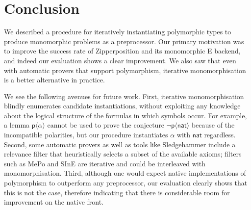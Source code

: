\documentclass[]{ceurart}
\newcommand\ty[1]{\textsf{#1}}
\newcommand\sym[1]{\textsf{#1}}
\begin{document}
%
%
%    

\section{Conclusion}
\label{sec:conclusion}

We described a procedure for iteratively instantiating polymorphic types to
produce monomorphic problems as a preprocessor. Our primary motivation was to
improve the success rate of Zipperposition and its monomorphic E backend, and
indeed our evaluation shows a clear improvement. We also saw that even with
automatic provers that support polymorphism, iterative monomorphisation is a
better alternative in practice.

We see the following avenues for future work. First, iterative monomorphisation
blindly enumerates candidate instantiations, without exploiting any knowledge
about the logical structure of the formulas in which symbols occur. For
example, a lemma $\sym{p}\langle\alpha\rangle$ cannot be used to prove the
conjecture $\lnot \sym{p}\langle\ty{nat}\rangle$ because of the incompatible
polarities, but our procedure instantiates $\alpha$ with $\ty{nat}$ regardless.
Second, some automatic provers as well as tools like Sledgehammer include a
relevance filter that heuristically selects a subset of the available axioms;
filters such as MePo \cite{meng-paulson-2009} and SInE
\cite{hoder-voronkov-2011} are iterative and could be interleaved with
monomorphisation. Third, although one would expect native implementations of
polymorphism to outperform any preprocessor, our evaluation clearly shows that
this is not the case, therefore indicating that there is considerable room for
improvement on the native front.
\end{document}

